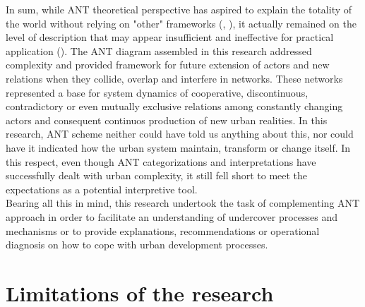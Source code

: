 \documentclass[11pt]{report}
\begin{document}
In sum, while ANT theoretical perspective has aspired to explain the totality of the world without relying on "other" frameworks (\cite{Lee and Brown 1994},  \cite{Gad and Jensen 2010}), it actually remained on the level of description that may appear insufficient and ineffective for practical application (\cite{Gabriel and Jacobs 2008}).
The ANT diagram assembled in this research addressed complexity and provided framework for future extension of actors and new relations when they collide, overlap and interfere in networks.
These networks represented a base for system dynamics of cooperative, discontinuous, contradictory or even mutually exclusive relations among constantly changing actors and consequent continuos production of new urban realities.
In this research, ANT scheme neither could have told us anything about this, nor could have it indicated how the urban system maintain, transform or change itself. In this respect, even though ANT categorizations and interpretations have successfully dealt with urban complexity, it still fell short to meet the expectations as a potential interpretive tool.
\\
Bearing all this in mind, this research undertook the task of complementing ANT approach in order to facilitate an understanding of undercover processes and mechanisms or to provide explanations, recommendations or operational diagnosis on how to cope with urban development processes.

\section{Limitations of the research}
\end{document}
